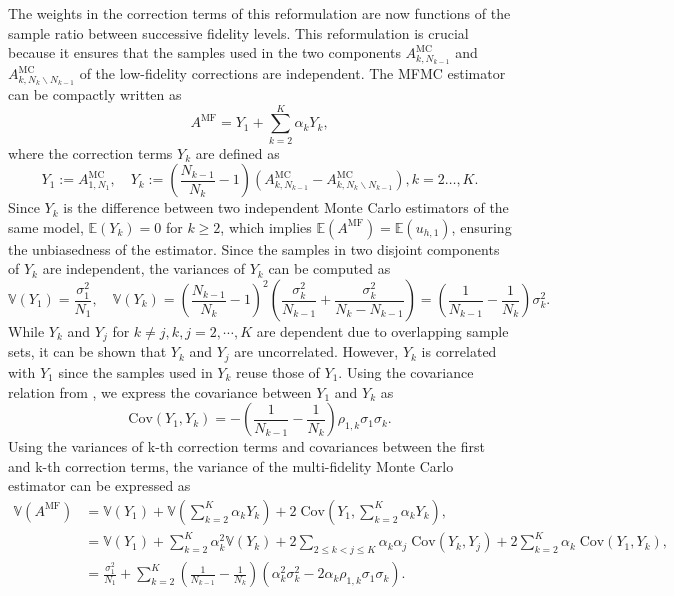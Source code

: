 %
The weights in the correction terms of this reformulation  are now functions of the sample ratio between successive fidelity levels. This reformulation is crucial because it ensures that the samples used in  the two components $A_{k,N_{k-1}}^{\text{MC}}$ and $A_{k,N_k\backslash N_{k-1}}^{\text{MC}}$ of the low-fidelity corrections are independent. The MFMC estimator can be compactly written as
%
\begin{equation}\label{eq:MFMC_estimator_Correction}
A^{\text{MF}} = Y_1 + \sum_{k=2}^K \alpha_k Y_k,
\end{equation}
%
where the correction terms $Y_k$ are defined as
%
\[
Y_1 :=A^{\text{MC}}_{1,N_1},\quad Y_k:=\left(\frac{N_{k-1}}{N_{k}}-1\right)\left(A_{k,N_{k-1}}^{\text{MC}}- A_{k,N_k\backslash N_{k-1}}^{\text{MC}}\right), k=2\ldots, K.
\]
%
Since $Y_k$ is the difference between two independent Monte Carlo estimators of the same model, $\mathbb{E}(Y_k) = 0$ for $k\ge 2$, which implies $\mathbb{E}(A^{\text{MF}}) = \mathbb{E}(u_{h,1})$, ensuring the unbiasedness of the estimator. Since the samples in two disjoint components of $Y_k$ are independent, the variances of $Y_k$ can be computed as
%
\[
\mathbb{V}\left(Y_1\right) = \frac{\sigma_1^2}{N_1}, \quad \mathbb{V}\left(Y_k\right) = \left(\frac{N_{k-1}}{N_{k}}-1\right)^2\left(\frac{\sigma_k^2}{N_{k-1}}+\frac{\sigma_k^2}{N_k-N_{k-1}}\right) = \left(\frac{1}{N_{k-1}} - \frac{1}{N_k}\right)\sigma_k^2.
\]
%
While $Y_k$ and $Y_j$ for $k\neq j, k,j=2,\cdots, K$ are dependent due to overlapping sample sets, it can be shown that $Y_k$ and $Y_j$ are uncorrelated. However, $Y_k$  is correlated with $Y_1$ since the samples used in $Y_k$ reuse those of $Y_1$. Using the covariance relation from \cite[Lemma~3.2]{PeWiGu:2016}, we express the covariance between $Y_1$ and $Y_k$ as
%
\[
\text{Cov}(Y_1,Y_k) = - \left(\frac{1}{N_{k-1}} - \frac{1}{N_k}\right)\rho_{1,k}\sigma_1\sigma_k.
\]
%
Using the variances of k-th correction terms and covariances between the first and k-th correction terms, the variance of the multi-fidelity Monte Carlo estimator can be expressed as
%
\begin{align}
    \nonumber
    \mathbb{V}\left(A^{\text{MF}}\right) &= \mathbb{V}\left(Y_1\right) + \mathbb{V}\left(\sum_{k=2}^K \alpha_kY_k\right)+2\;\text{Cov}\left(Y_1,\sum_{k=2}^K \alpha_k Y_k \right),\\
    \nonumber
    &=\mathbb{V}\left(Y_1\right) + \sum_{k=2}^K \alpha_k^2 \mathbb{V}\left(Y_k\right)+2\sum_{2\le k<j\le K} \alpha_k\alpha_j\; \text{Cov}(Y_k,Y_j) +2\sum_{k=2}^K \alpha_k\;\text{Cov}\left(Y_1, Y_k\right),\\
    \label{eq:MFMC_variance}
    &=\frac{\sigma_1^2}{N_1} + \sum_{k=2}^K \left(\frac{1}{N_{k-1}} - \frac{1}{N_k}\right)\left(\alpha_k^2\sigma_k^2 - 2\alpha_k\rho_{1,k}\sigma_1\sigma_k\right).
\end{align}
